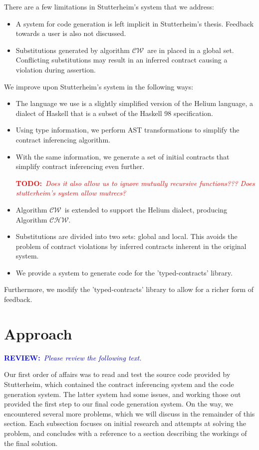 \documentclass[10pt]{report}
\newcommand{\CW}{$\mathcal{CW}$}
\newcommand{\CHW}{$\mathcal{CHW}$}
\newcommand{\annotate}[3]{
	\begin{scriptsize}
	\textcolor{#1}{\textbf{#2}~\textit{#3}}
	\end{scriptsize}\newline}
\newcommand{\todo}[1]{\annotate{red} {TODO:} {#1}}
\newcommand{\review}{\annotate{blue} {REVIEW:} {Please review the following text. \newline}}
\begin{document}
There are a few limitations in Stutterheim's system that we address:

\begin{itemize}
	\item A system for code generation is left implicit in Stutterheim's thesis. Feedback towards a user is also not discussed.
	\item Substitutions generated by algorithm \CW ~are in placed in a global set. Conflicting substitutions may result in an inferred contract causing a violation during assertion.
\end{itemize}

We improve upon Stutterheim's system in the following ways:
\begin{itemize}
	\item The language we use is a slightly simplified version of the Helium language, a dialect of Haskell that is a subset of the Haskell 98 specification.
	\item Using type information, we perform AST transformations to simplify the contract inferencing algorithm.
	\item With the same information, we generate a set of initial contracts that simplify contract inferencing even further. \todo{Does it also allow us to ignore mutually recursive functions??? Does stutterheim's system allow mutrecs?}
	\item Algorithm \CW ~is extended to support the Helium dialect, producing Algorithm \CHW.
	\item Substitutions are divided into two sets: global and local. This avoids the problem of contract violations by inferred contracts inherent in the original system.
	\item We provide a system to generate code for the 'typed-contracts' library.
\end{itemize}

Furthermore, we modify the 'typed-contracts' library to allow for a richer form of feedback.



\chapter{Approach}

\review

Our first order of affairs was to read and test the source code provided by Stutterheim, which contained the contract inferencing system and the code generation system.
The latter system had some issues, and working those out provided the first step to our final code generation system.
On the way, we encountered several more problems, which we will discuss in the remainder of this section.
Each subsection focuses on initial research and attempts at solving the problem, and concludes with a reference to a section describing the workings of the final solution.
\end{document}

